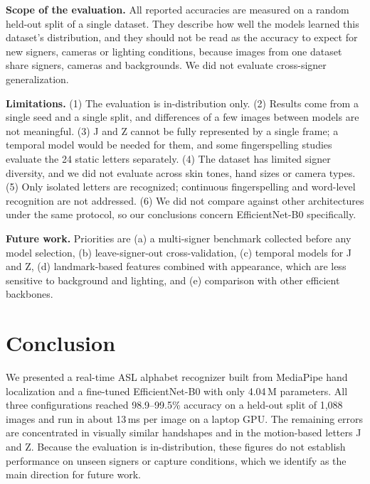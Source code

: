 \documentclass[conference]{IEEEtran}
\begin{document}
\textbf{Scope of the evaluation.} All reported accuracies are measured on a random held-out split of a single dataset. They describe how well the models learned this dataset's distribution, and they should not be read as the accuracy to expect for new signers, cameras or lighting conditions, because images from one dataset share signers, cameras and backgrounds\~\cite{torralba2011unbiased,quinonero2009dataset}. We did not evaluate cross-signer generalization.

\textbf{Limitations.} (1) The evaluation is in-distribution only. (2) Results come from a single seed and a single split, and differences of a few images between models are not meaningful. (3) J and Z cannot be fully represented by a single frame; a temporal model would be needed for them, and some fingerspelling studies evaluate the 24 static letters separately. (4) The dataset has limited signer diversity, and we did not evaluate across skin tones, hand sizes or camera types. (5) Only isolated letters are recognized; continuous fingerspelling and word-level recognition are not addressed. (6) We did not compare against other architectures under the same protocol, so our conclusions concern EfficientNet-B0 specifically.

\textbf{Future work.} Priorities are (a) a multi-signer benchmark collected before any model selection, (b) leave-signer-out cross-validation, (c) temporal models for J and Z, (d) landmark-based features combined with appearance, which are less sensitive to background and lighting, and (e) comparison with other efficient backbones\~\cite{sandler2018mobilenetv2,dosovitskiy2021image}.

\section{Conclusion}
\label{sec:conclusion}
We presented a real-time ASL alphabet recognizer built from MediaPipe hand localization and a fine-tuned EfficientNet-B0 with only 4.04\,M parameters. All three configurations reached 98.9--99.5\% accuracy on a held-out split of 1{,}088 images and run in about 13\,ms per image on a laptop GPU. The remaining errors are concentrated in visually similar handshapes and in the motion-based letters J and Z. Because the evaluation is in-distribution, these figures do not establish performance on unseen signers or capture conditions, which we identify as the main direction for future work.
\end{document}
